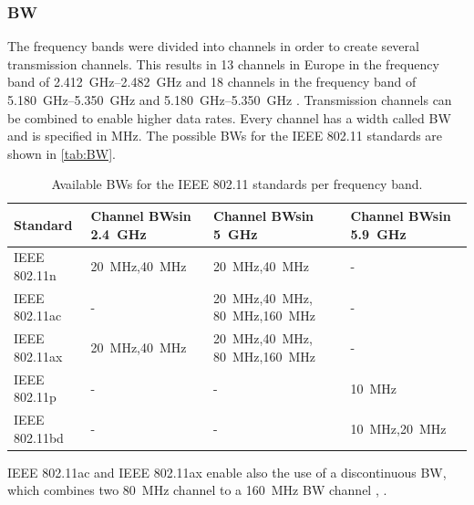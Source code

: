 \subsubsection*{\acf{BW}}
The frequency bands were divided into channels in order to create several transmission channels.
This results in 13 channels in Europe in the frequency band of \SIrange{2.412}{2.482}{\giga\hertz} and 18 channels in the frequency band of \SIrange{5.180}{5.350}{\giga\hertz} and \SIrange{5.180}{5.350}{\giga\hertz}  \cite{sauter_wireless_2022}.
Transmission channels can be combined to enable higher data rates.
Every channel has a width called \ac{BW} and is specified in \si{\mega\hertz}.
The possible \ac{BW}s for the IEEE 802.11 standards are shown in \autoref{tab:BW}.
\begin{table}[!ht]
	\centering
	\begin{tabular}{>{\raggedright}p{2.2cm}p{2.50cm}p{2.55cm}p{2.50cm}}
		\toprule
		Standard & Channel \ac{BW}s\newline in \SI{2.4}{\giga\hertz}& Channel \ac{BW}s\newline in \SI{5}{\giga\hertz} &  Channel \ac{BW}s\newline in  \SI{5.9}{\giga\hertz}\\
		\midrule
		IEEE 802.11n \cite{sauter_wireless_2022}& \SI{20}{\mega\hertz},\SI{40}{\mega\hertz}  & \SI{20}{\mega\hertz},\SI{40}{\mega\hertz} & - \\
		\midrule
		IEEE 802.11ac \cite{noauthor_ieee_2021-1}& -  & \SI{20}{\mega\hertz},\SI{40}{\mega\hertz}, \SI{80}{\mega\hertz},\SI{160}{\mega\hertz} & - \\
		\midrule
		IEEE 802.11ax \cite{noauthor_ieee_2021}&\SI{20}{\mega\hertz},\SI{40}{\mega\hertz}  & \SI{20}{\mega\hertz},\SI{40}{\mega\hertz}, \SI{80}{\mega\hertz},\SI{160}{\mega\hertz} & - \\
		\midrule
		IEEE 802.11p \cite{jacob_system-level_2020}& - & - & \SI{10}{\mega\hertz} \\
		\midrule
		IEEE 802.11bd \cite{jacob_system-level_2020}& - & - & \SI{10}{\mega\hertz},\SI{20}{\mega\hertz} \\
		\bottomrule
	\end{tabular}
	\caption{Available \ac{BW}s for the IEEE 802.11 standards per frequency band.}
	\label{tab:BW}
\end{table}

IEEE 802.11ac and IEEE 802.11ax enable also the use of a discontinuous \ac{BW}, which combines two \SI{80}{\mega\hertz}
channel to a \SI{160}{\mega\hertz} \ac{BW} channel \cite{noauthor_ieee_2021}, \cite{noauthor_ieee_2021-1}.

